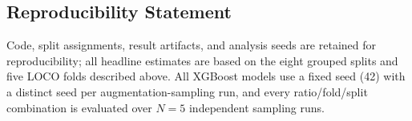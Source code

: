 \documentclass[conference,a4paper]{IEEEtran}
\begin{document}
\subsection{Reproducibility Statement}
Code, split assignments, result artifacts, and analysis seeds are retained for reproducibility; all headline estimates are based on the eight grouped splits and five LOCO folds described above. All XGBoost models use a fixed seed (42) with a distinct seed per augmentation-sampling run, and every ratio/fold/split combination is evaluated over $N=5$ independent sampling runs.



\end{document}
